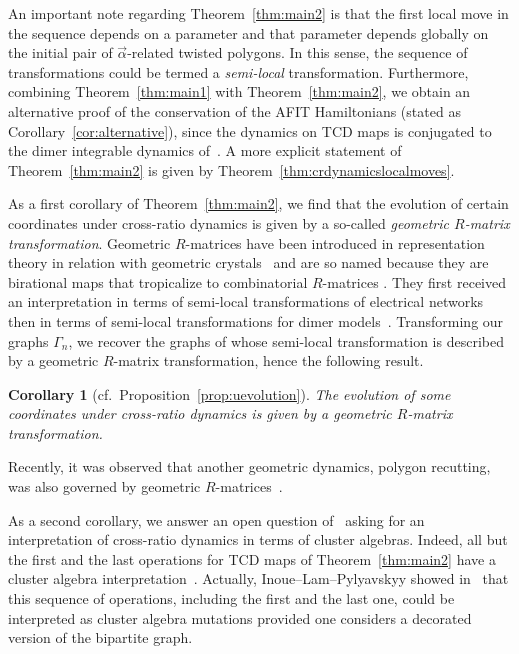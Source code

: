 \documentclass[pdftex]{sigma}
\numberwithin{equation}{section}
\newtheorem{Corollary}[Theorem]{Corollary}
\begin{document}
	An important note regarding Theorem~\ref{thm:main2} is that the first local move in the sequence depends on a parameter and that parameter depends globally on the initial pair of $\vec{\alpha}$-related twisted polygons. {In this sense, the sequence of transformations could be termed a \emph{semi-local} transformation.} Furthermore, combining Theorem~\ref{thm:main1} with Theorem~\ref{thm:main2}, we obtain an alternative proof of the conservation of the AFIT Hamiltonians (stated as Corollary~\ref{cor:alternative}), since the dynamics on TCD maps is conjugated to the dimer integrable dynamics of~\cite{GK13}. A more explicit statement of Theorem~\ref{thm:main2} is given by Theorem~\ref{thm:crdynamicslocalmoves}.
	
	As a first corollary of Theorem~\ref{thm:main2}, we find that the evolution of certain coordinates under cross-ratio dynamics is given by a so-called \emph{geometric $R$-matrix transformation}. Geometric $R$-matrices have been introduced in representation theory in relation with geometric crystals~\mbox{\cite{BK,Etingof,KNY,KNO}} and are so named because they are birational maps that tropicalize to combinatorial $R$-matrices \cite{MR1187560}. They first received an interpretation in terms of semi-local transformations of electrical networks~\cite{LP3, LP1,LP2} then in terms of semi-local transformations for dimer models~\mbox{\cite{Chepuri,GeRa, ILP1,ILP2}}. Transforming our graphs $\Gamma_n$, we recover the graphs of \cite{ILP1} whose semi-local transformation is described by a geometric $R$-matrix transformation, hence the following result.
	
	\begin{Corollary}[cf.\ Proposition~\ref{prop:uevolution}]
		\label{cor:rmatrix}
		The evolution of some coordinates under cross-ratio dynamics is given by a geometric $R$-matrix transformation.
	\end{Corollary}
	
	Recently, it was observed that another geometric dynamics, polygon recutting, was also governed by geometric $R$-matrices~\cite{Izosimov2}.
	
	As a second corollary, we answer an open question of~\cite{AFIT} asking for an interpretation of cross-ratio dynamics in terms of cluster algebras. Indeed, all but the first and the last operations for TCD maps of Theorem~\ref{thm:main2} have a cluster algebra interpretation~\cite{AGPR,AGR}. Actually, Inoue--Lam--Pylyavskyy showed in~\cite{ILP2} that this sequence of operations, including the first and the last one, could be interpreted as cluster algebra mutations provided one considers a decorated version of the bipartite graph.
	
\end{document}
